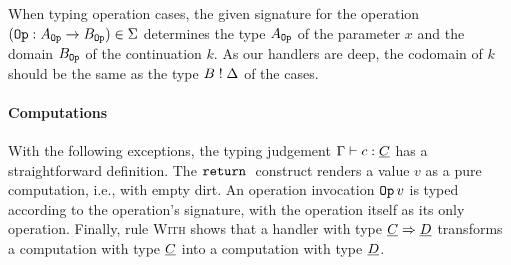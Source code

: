 \documentclass[sigplan,10pt]{acmart}\settopmatter{printfolios=true}
\begin{document}
When typing operation cases, the given signature for the operation
\((\mathtt{Op} \mathrel{:} A_{\mathtt{Op}} \to B_{\mathtt{Op}}) \in \Sigma\) determines the type \(A_{\mathtt{Op}}\) of
the parameter \(x\) and the domain \(B_{\mathtt{Op}}\) of the continuation \(k\).
As our handlers are deep, the codomain of \(k\) should be the same as
the type \(B \mathrel{!} \Delta\) of the cases.

\paragraph{Computations}

With the following exceptions, the typing judgement \(\Gamma \vdash c : \underline{C}\)
has a straightforward definition. The \(\mathtt{return}\;\) construct renders a value
\(v\) as a pure computation, i.e., with empty dirt. An operation
invocation \(\mathtt{Op}\,v\) is typed according to the operation's signature,
with the operation itself as its only operation. Finally, rule
\textsc{With} shows that a handler with type \(\underline{C} \Rightarrow \underline{D}\) transforms a
computation with type \(\underline{C}\) into a computation with type \(\underline{D}\).
\end{document}
